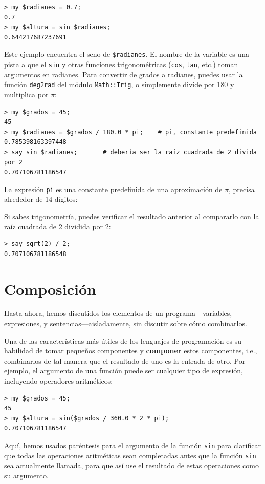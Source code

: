 \begin{lstlisting}
> my $radianes = 0.7;
0.7
> my $altura = sin $radianes;
0.644217687237691
\end{lstlisting}

Este ejemplo encuentra el seno de \verb|$radianes|. El 
nombre de la variable es una pista a que el {\tt sin} y 
otras funciones trigonométricas ({\tt cos}, {\tt tan}, etc.) toman
argumentos en radianes. Para convertir de grados a radianes, puedes
usar la función \verb'deg2rad' del  módulo \verb|Math::Trig|, o
simplemente divide por 180 y multiplica por $\pi$:

\begin{lstlisting}
> my $grados = 45;
45
> my $radianes = $grados / 180.0 * pi;    # pi, constante predefinida 
0.785398163397448
> say sin $radianes;       # debería ser la raíz cuadrada de 2 divida por 2
0.707106781186547
\end{lstlisting}
%
La expresión {\tt pi} es una constante predefinida de una
aproximación de $\pi$, precisa alrededor de 14 dígitos:

Si sabes trigonometría, puedes verificar el resultado anterior
al compararlo con la raíz cuadrada de 2 dividida por 2:

\begin{lstlisting}
> say sqrt(2) / 2;
0.707106781186548
\end{lstlisting}
%

\section{Composición}

Hasta ahora, hemos discutidos los elementos de un programa---variables,
expresiones, y sentencias---aisladamente, sin discutir sobre
cómo combinarlos.

Una de las características más útiles de los lenguajes de programación
es su habilidad de tomar pequeños componentes y {\bf componer} estos
componentes, i.e.,
combinarlos de tal manera que el resultado de uno es la entrada
de otro. Por ejemplo, el argumento de una función  puede ser cualquier
tipo de expresión, incluyendo operadores aritméticos:

\begin{lstlisting}
> my $grados = 45;
45
> my $altura = sin($grados / 360.0 * 2 * pi);
0.707106781186547
\end{lstlisting}
%
Aquí, hemos usados paréntesis para el argumento de la función
{\tt sin} para clarificar que todas las operaciones aritméticas
sean completadas antes que la función {\tt sin} sea actualmente
llamada, para que así use el resultado de estas operaciones 
como su argumento.

